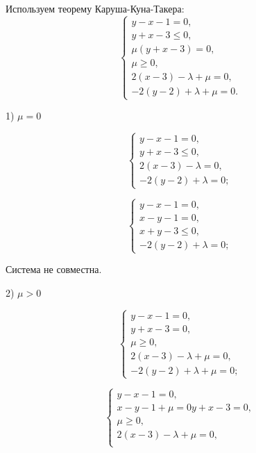 \documentclass[12pt]{article}
\begin{document}
Используем теорему Каруша-Куна-Такера:
\begin{equation}
\begin{cases}
y-x-1 = 0,\\
y+x-3 \leq 0,\\
\mu(y+x-3) = 0,\\
\mu \geq 0,\\
2(x-3)-\lambda+\mu=0,\\ 
-2(y-2) +\lambda+\mu = 0.
\end{cases}
\end{equation}

1) $\mu = 0$

\begin{equation}
\begin{cases}
y-x-1 = 0,\\
y+x-3 \leq 0,\\
2(x-3)-\lambda=0,\\ 
-2(y-2) +\lambda = 0;
\end{cases}
\end{equation}

\begin{equation}
\begin{cases}
y-x-1 = 0,\\
x - y - 1=0,\\ 
x + y - 3 \leq 0,\\
-2(y-2) +\lambda = 0;
\end{cases}
\end{equation}

Система не совместна.

2) $\mu > 0$

\begin{equation}
\begin{cases}
y-x-1 = 0,\\
y+x-3 = 0,\\
\mu \geq 0,\\
2(x-3)-\lambda+\mu=0,\\ 
-2(y-2) +\lambda+\mu = 0;
\end{cases}
\end{equation}

\begin{equation}
\begin{cases}
y-x-1 = 0,\\
x-y-1+\mu = 0
y+x-3 = 0,\\
\mu \geq 0,\\
2(x-3)-\lambda+\mu=0,\\ 
\end{cases}
\end{equation}
\end{document}
